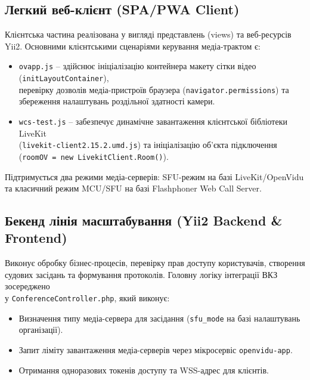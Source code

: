 \documentclass{article}
\begin{document}
\subsection{Легкий веб-клієнт (SPA/PWA Client)}
Клієнтська частина реалізована у вигляді представлень (views) та веб-ресурсів Yii2. Основними клієнтськими сценаріями керування медіа-трактом є:
\begin{itemize}
    \item \texttt{ovapp.js} -- здійснює ініціалізацію контейнера макету сітки відео (\texttt{initLayoutContainer}), \\
            перевірку дозволів медіа-пристроїв браузера (\texttt{navigator.permissions}) та збереження налаштувань роздільної здатності камери.
    \item \texttt{wcs-test.js} -- забезпечує динамічне завантаження клієнтської бібліотеки LiveKit \\ 
            (\texttt{livekit-client2.15.2.umd.js}) та ініціалізацію об'єкта підключення (\texttt{roomOV = new LivekitClient.Room()}).
\end{itemize}
Підтримується два режими медіа-серверів: SFU-режим на базі LiveKit/OpenVidu та класичний режим MCU/SFU на базі Flashphoner Web Call Server.

\subsection{Бекенд лінія масштабування (Yii2 Backend \& Frontend)}
Виконує обробку бізнес-процесів, перевірку прав доступу користувачів, створення судових засідань та формування протоколів.
Головну логіку інтеграції ВКЗ зосереджено \\ у \texttt{ConferenceController.php}, який виконує:
\begin{itemize}
    \item Визначення типу медіа-сервера для засідання (\texttt{sfu\_mode} на базі налаштувань організації).
    \item Запит ліміту завантаження медіа-серверів через мікросервіс \texttt{openvidu-app}.
    \item Отримання одноразових токенів доступу та WSS-адрес для клієнтів.
\end{itemize}
\end{document}
